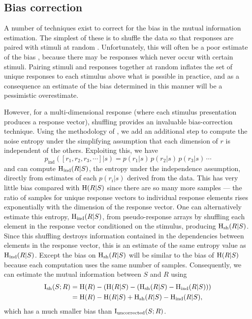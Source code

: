 \subsection{Bias correction}
\label{sec:info-bias}

A number of techniques exist to correct for the bias in the mutual information estimation.
The simplest of these is to shuffle the data so that responses are paired with stimuli at random \citep{Optican1991}.
Unfortunately, this will often be a poor estimate of the bias \citep{Panzeri1996}, because there may be responses which never occur with certain stimuli.
Pairing stimuli and responses together at random inflates the set of unique responses to each stimulus above what is possible in practice, and as a consequence an estimate of the bias determined in this manner will be a pessimistic overestimate.

However, for a multi-dimensional response (where each stimulus presentation produces a response vector), shuffling provides an invaluable bias-correction technique.
Using the methodology of \citet{Montemurro2007}, we add an additional step to compute the noise entropy under the simplifying assumption that each dimension of $r$ is independent of the others.
Exploiting this, we have
\begin{equation}
p_\text{ind}([r_1,r_2,r_3,\cdots]|s) = p(r_1|s) \, p(r_2|s) \, p(r_3|s) \, \cdots
\end{equation}
and can compute $\operatorname{H}_\text{ind}( R | S )$, the entropy under the independence assumption, directly from estimates of each $p(r_i|s)$ derived from the data.
This has very little bias compared with $\operatorname{H}( R | S )$ since there are so many more samples --- the ratio of samples for unique response vectors to individual response elements rises exponentially with the dimension of the response vector.
One can alternatively estimate this entropy, $\operatorname{H}_\text{ind}( R | S )$, from pseudo-response arrays by shuffling each element in the response vector conditioned on the stimulus, producing $\operatorname{H}_\text{sh}( R | S )$.
Since this shuffling destroys information contained in the dependencies between elements in the response vector, this is an estimate of the same entropy value as $\operatorname{H}_\text{ind}( R | S )$.
Except the bias on $\operatorname{H}_\text{sh}( R | S )$ will be similar to the bias of $\operatorname{H}( R | S )$ because each computation uses the same number of samples.
Consequently, we can estimate the mutual information between $S$ and $R$ using
\begin{align}
\operatorname{I}_{\text{sh}}(S;R)
   &= \operatorname{H}( R ) - \left( \operatorname{H}( R | S ) - \left( \operatorname{H}_\text{sh}( R | S ) - \operatorname{H}_\text{ind}( R | S ) \right) \right) \notag
\\ &= \operatorname{H}( R ) - \operatorname{H}( R | S ) + \operatorname{H}_\text{sh}( R | S ) - \operatorname{H}_\text{ind}( R | S )
,\end{align}
which has a much smaller bias than $\operatorname{I}_{\text{uncorrected}}(S;R)$.

